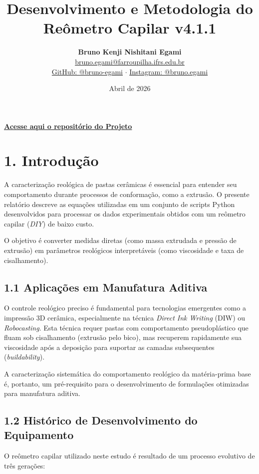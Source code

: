 \documentclass[a4paper,12pt]{article}
\title{Desenvolvimento e Metodologia do Reômetro Capilar v4.1.1}
\author{
    \textbf{Bruno Kenji Nishitani Egami} \\
    \small \href{mailto:bruno.egami@farroupilha.ifrs.edu.br}{bruno.egami@farroupilha.ifrs.edu.br} \\
    \small \href{https://github.com/bruno-egami}{GitHub: @bruno-egami} $\cdot$ 
    \href{https://www.instagram.com/bruno.egami/}{Instagram: @bruno.egami}
}
\date{Abril de 2026}
\begin{document}
\maketitle

\noindent
\href{https://github.com/bruno-egami/Reometro_Capilar/tree/Reometro-capilar-Transdutor_Pasta}{\textbf{Acesse aqui o repositório do Projeto}}

\section*{1. Introdução}
A caracterização reológica de pastas cerâmicas é essencial para entender seu comportamento durante processos de conformação, como a extrusão. O presente relatório descreve as equações utilizadas em um conjunto de scripts Python desenvolvidos para processar os dados experimentais obtidos com um reômetro capilar (\textit{DIY}) de baixo custo.

O objetivo é converter medidas diretas (como massa extrudada e pressão de extrusão) em parâmetros reológicos interpretáveis (como viscosidade e taxa de cisalhamento).

\subsection*{1.1 Aplicações em Manufatura Aditiva}
O controle reológico preciso é fundamental para tecnologias emergentes como a impressão 3D cerâmica, especialmente na técnica \textit{Direct Ink Writing} (DIW) ou \textit{Robocasting}. Esta técnica requer pastas com comportamento pseudoplástico que fluam sob cisalhamento (extrusão pelo bico), mas recuperem rapidamente sua viscosidade após a deposição para suportar as camadas subsequentes (\textit{buildability}).

A caracterização sistemática do comportamento reológico da matéria-prima base é, portanto, um pré-requisito para o desenvolvimento de formulações otimizadas para manufatura aditiva.

\subsection*{1.2 Histórico de Desenvolvimento do Equipamento}
O reômetro capilar utilizado neste estudo é resultado de um processo evolutivo de três gerações:
\end{document}
